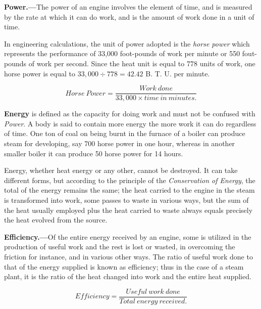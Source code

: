 \documentclass[11pt, a5paper]{book}
\begin{document}
\textbf{Power.---}The power of an engine involves the element of time,
and is measured by the rate at which it can do work, and is the amount
of work done in a unit of time.\par

In engineering calculations, the unit of power adopted is the
\textit{horse power} which represents the performance of 33,000
foot-pounds of work per minute or 550 fout-pounds of work per second.
Since the heat unit is equal to 778 units of work, one horse power is
equal to $33,000 \div 778 = 42.42$ B. T. U. per minute.\par

\begin{equation*}
  Horse\:Power = \frac{Work\:done}{33,000 \times time\:in\:minutes.}
\end{equation*}

\textbf{Energy} is defined as the capacity for doing work and must not
be confused with \textit{Power}.  A body is said to contain more
energy the more work it can do regardless of time.  One ton of coal on
being burnt in the furnace of a boiler can produce steam for
developing, say 700 horse power in one hour, whereas in another
smaller boiler it can produce 50 horse power for 14 hours.\par

Energy, whether heat energy or any other, cannot be destroyed.  It can
take different forms, but according to the principle of the
\textit{Conservation of Energy}, the total of the energy remains the
same; the heat carried to the engine in the steam is transformed into
work, some passes to waste in various ways, but the sum of the heat
usually employed plus the heat carried to waste always equals
precisely the heat evolved from the source.\par

\textbf{Efficiency.---}Of the entire energy received by an engine,
some is utilized in the production of useful work and the rest is lost
or wasted, in overcoming the friction for instance, and in various
other ways.  The ratio of useful work done to that of the energy
supplied is known as efficiency; thus in the case of a steam plant, it
is the ratio of the heat changed into work and the entire heat
supplied.\par

\begin{equation*}
  Efficiency = \frac{Useful\:work\:done}{Total\:energy\:received.}
\end{equation*}
\end{document}
